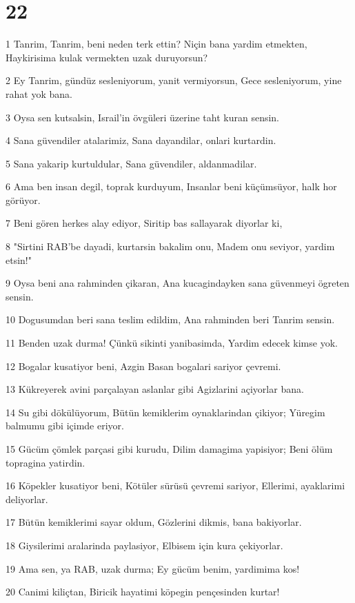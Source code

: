 \chapter{22}

\par 1 Tanrim, Tanrim, beni neden terk ettin? Niçin bana yardim etmekten, Haykirisima kulak vermekten uzak duruyorsun?
\par 2 Ey Tanrim, gündüz sesleniyorum, yanit vermiyorsun, Gece sesleniyorum, yine rahat yok bana.
\par 3 Oysa sen kutsalsin, Israil'in övgüleri üzerine taht kuran sensin.
\par 4 Sana güvendiler atalarimiz, Sana dayandilar, onlari kurtardin.
\par 5 Sana yakarip kurtuldular, Sana güvendiler, aldanmadilar.
\par 6 Ama ben insan degil, toprak kurduyum, Insanlar beni küçümsüyor, halk hor görüyor.
\par 7 Beni gören herkes alay ediyor, Siritip bas sallayarak diyorlar ki,
\par 8 "Sirtini RAB'be dayadi, kurtarsin bakalim onu, Madem onu seviyor, yardim etsin!"
\par 9 Oysa beni ana rahminden çikaran, Ana kucagindayken sana güvenmeyi ögreten sensin.
\par 10 Dogusumdan beri sana teslim edildim, Ana rahminden beri Tanrim sensin.
\par 11 Benden uzak durma! Çünkü sikinti yanibasimda, Yardim edecek kimse yok.
\par 12 Bogalar kusatiyor beni, Azgin Basan bogalari sariyor çevremi.
\par 13 Kükreyerek avini parçalayan aslanlar gibi Agizlarini açiyorlar bana.
\par 14 Su gibi dökülüyorum, Bütün kemiklerim oynaklarindan çikiyor; Yüregim balmumu gibi içimde eriyor.
\par 15 Gücüm çömlek parçasi gibi kurudu, Dilim damagima yapisiyor; Beni ölüm topragina yatirdin.
\par 16 Köpekler kusatiyor beni, Kötüler sürüsü çevremi sariyor, Ellerimi, ayaklarimi deliyorlar.
\par 17 Bütün kemiklerimi sayar oldum, Gözlerini dikmis, bana bakiyorlar.
\par 18 Giysilerimi aralarinda paylasiyor, Elbisem için kura çekiyorlar.
\par 19 Ama sen, ya RAB, uzak durma; Ey gücüm benim, yardimima kos!
\par 20 Canimi kiliçtan, Biricik hayatimi köpegin pençesinden kurtar!
